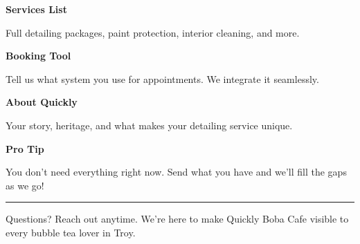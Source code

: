 \documentclass[11pt,letterpaper]{article}
\begin{document}
\begin{minipage}[t]{0.48\textwidth}
\begin{tcolorbox}[colframe=accent-teal, boxrule=1pt, left=0.7em, right=0.7em, top=0.5em, bottom=0.5em, arc=4pt, boxsep=0pt]
{\bfseries\small\color{accent-teal}Services List}

\vspace{0.15em}

{\small Full detailing packages, paint protection, interior cleaning, and more.}
\end{tcolorbox}

\vspace{0.1em}

\begin{tcolorbox}[colframe=accent-teal, boxrule=1pt, left=0.7em, right=0.7em, top=0.5em, bottom=0.5em, arc=4pt, boxsep=0pt]
{\bfseries\small\color{accent-teal}Booking Tool}

\vspace{0.15em}

{\small Tell us what system you use for appointments. We integrate it seamlessly.}
\end{tcolorbox}

\vspace{0.1em}

\begin{tcolorbox}[colframe=accent-teal, boxrule=1pt, left=0.7em, right=0.7em, top=0.5em, bottom=0.5em, arc=4pt, boxsep=0pt]
{\bfseries\small\color{accent-teal}About Quickly}

\vspace{0.15em}

{\small Your story, heritage, and what makes your detailing service unique.}
\end{tcolorbox}

\vspace{-0.2em}
\end{minipage}

\vspace{0.15em}

\begin{tcolorbox}[colback={accent-red!5}, colframe=accent-red!20, boxrule=0.5pt, left=0.7em, right=0.7em, top=0.4em, bottom=0.4em, arc=6pt, boxsep=0pt]

{\bfseries\small\color{accent-red}Pro Tip}

\vspace{0.1em}

{\small You don't need everything right now. Send what you have and we'll fill the gaps as we go!}

\end{tcolorbox}

\vspace{0.15em}

\noindent\hrule
\vspace{0.2em}

{\small\color{text-light}Questions? Reach out anytime. We're here to make Quickly Boba Cafe visible to every bubble tea lover in Troy.}
\end{document}
